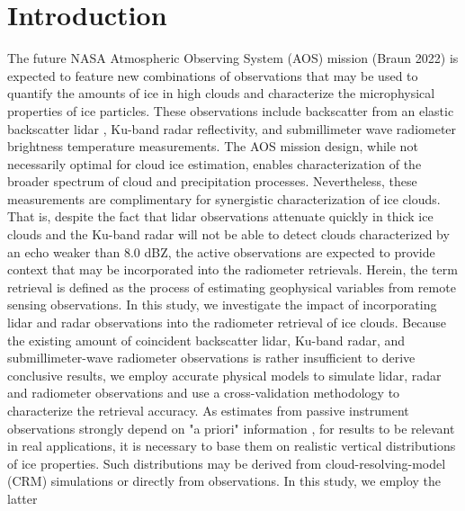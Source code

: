 \documentclass{ametsocV6.1}
\begin{document}
\section{Introduction}
The future NASA Atmospheric Observing System (AOS) mission (Braun 2022) is expected to feature new 
combinations of observations that may be used to quantify the amounts of ice in high clouds and 
characterize the microphysical properties of ice particles. These observations include backscatter
from an elastic backscatter lidar \citep{weitkamp2006},
Ku-band radar reflectivity, and submillimeter wave radiometer brightness temperature measurements. 
The AOS mission design, while not necessarily optimal for cloud ice estimation, enables characterization 
of the broader spectrum of cloud and precipitation processes. Nevertheless, these measurements are 
complimentary for synergistic characterization of ice clouds. 
That is, despite the fact that lidar observations 
attenuate quickly in thick ice clouds and the Ku-band radar will not be able to detect clouds 
characterized by an echo weaker than 8.0 dBZ, the active observations are expected to provide context 
that may be incorporated into the radiometer retrievals. Herein, the term retrieval is defined as the 
process of estimating geophysical variables from remote sensing observations.
In this study, we investigate the impact of 
incorporating lidar and radar observations into the radiometer retrieval of ice clouds.
Because the existing amount of coincident backscatter lidar, Ku-band radar, and submillimeter-wave 
radiometer observations is rather insufficient to derive conclusive results, we employ accurate 
physical models to simulate lidar, radar and radiometer observations and use a cross-validation 
methodology to characterize the retrieval accuracy. As estimates from passive instrument 
observations strongly depend on "a priori" information \citep{rodgers2000inverse}, for results to be 
relevant in real applications, it is necessary to base them on realistic vertical distributions of 
ice properties.  Such distributions may be derived from cloud-resolving-model (CRM) simulations 
\citep{pfreundschuh2020synergistic,liu2022assessing} or directly from observations.  In this study, we employ the latter 
\end{document}
